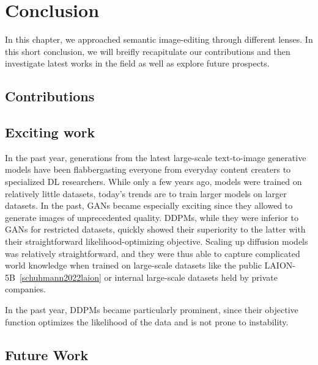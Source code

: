\chapter{Conclusion}
\label{chapter:conclusion}

{}



In this chapter, we approached semantic image-editing through different lenses. 
In this short conclusion, we will breifly recapitulate our contributions and then 
investigate latest works in the field as well as explore future prospects. 


\section{Contributions}


\section{Exciting work}
In the past year, generations from the latest large-scale text-to-image generative models have been flabbergasting 
everyone from everyday content creaters to specialized \ac{DL} researchers. While only a few years ago, models were 
trained on relatively little datasets, today's trends are to train larger models on larger datasets. 
In the past, \ac{GAN}s became especially exciting since they allowed to generate images of unprecedented quality. 
\ac{DDPM}s, while they were inferior to \ac{GAN}s for restricted datasets, quickly showed their superiority to 
the latter with their straightforward likelihood-optimizing objective. Scaling up diffusion models was relatively 
straightforward, and they were thus able to capture complicated world knowledge when trained on large-scale datasets 
like the public LAION-5B~\ref{schuhmann2022laion} or internal large-scale datasets held by private companies.

In the past year, 
\ac{DDPM}s became particularly prominent, since their objective function optimizes the likelihood of the data
and is not prone to instability. 


\section{Future Work}